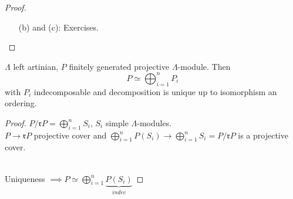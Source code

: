 \begin{prop}
\begin{proof}
\begin{enumerate}
\item[(b) and (c):] Exercises.
\end{enumerate}
\end{proof}
\end{prop}

\begin{prop}
$\Lambda$ left artinian, $P$ finitely generated projective $\Lambda$-module. Then \[P \simeq \bigoplus_{i=1}^n P_i\] with $P_i$ indecomposable and decomposition is unique up to isomorphism an ordering.

\begin{proof}
$P / \mathfrak{r}P = \bigoplus_{i=1}^n S_i$, $S_i$ simple $\Lambda$-modules.\\
$P \to \mathfrak{r}P$ projective cover and $\bigoplus_{i=1}^n P(S_i) \to \bigoplus_{i=1}^n S_i = P / \mathfrak{r}P$ is a projective cover.\\
\\
\centerline{Uniqueness $\implies P \simeq \bigoplus_{i=1}^n \underbrace{P(S_i)}_{indec}$}
\end{proof}
\end{prop}

